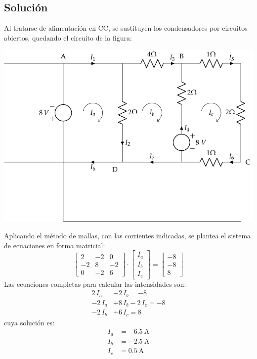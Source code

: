 \subsection*{Solución}
Al tratarse de alimentación en CC, se sustituyen los condensadores por
circuitos abiertos, quedando el circuito de la figura:
\begin{center}
  \includegraphics{figuras/BT1_11_mod.pdf}
\end{center}

Aplicando el método de mallas, con las corrientes indicadas, se
plantea el sistema de ecuaciones en forma matricial:
\begin{equation*}
  \begin{bmatrix}
    2 & -2 & 0 \\
    -2 & 8 & -2 \\
    0 & -2 & 6
  \end{bmatrix} \cdot
  \begin{bmatrix}
    I_a\\
    I_b\\
    I_c
  \end{bmatrix} = %
  \begin{bmatrix}
    -8 \\
    -8\\
    8
  \end{bmatrix}
\end{equation*}
Las ecuaciones completas para calcular las intensidades son:
\begin{align*}
  2\,I_a&-2\,I_b = -8\\
  -2\,I_a&+8\,I_b-2\,I_c = -8\\
  -2\,I_b&+ 6\,I_c = 8
\end{align*}
cuya solución es:
\begin{align*}
  I_a&=\qty{-6.5}{\ampere}\\
  I_b&=\qty{-2.5}{\ampere}\\
  I_c&=\qty{0.5}{\ampere}\\
\end{align*}

